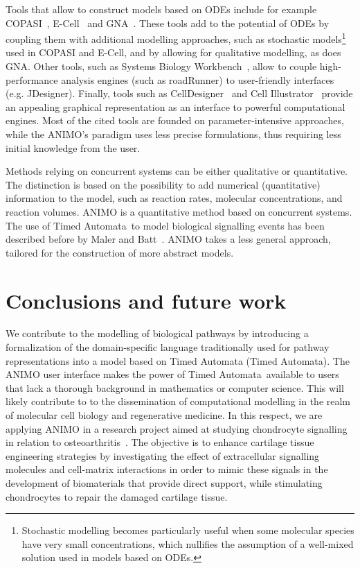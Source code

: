 \documentclass[journal, 10pt]{IEEEtran}
\def\tas{Timed Automata}
\begin{document}
Tools that allow to construct models based on ODEs include for example COPASI~\cite{copasi}, 
E-Cell~\cite{e-cell} and GNA~\cite{gna}.
These tools add to the potential of ODEs by coupling them with additional modelling approaches,
such as stochastic models\footnote{Stochastic modelling becomes particularly useful when some
molecular species have very small concentrations, which nullifies the assumption of a well-mixed solution used in models based on ODEs.}
used in COPASI and E-Cell, and by allowing for qualitative modelling, as does GNA.
Other tools, such as Systems Biology Workbench~\cite{sbw}, allow to couple high-performance
analysis engines (such as roadRunner) to user-friendly interfaces (e.g. JDesigner). Finally, tools such as CellDesigner~\cite{celldesigner}
and Cell Illustrator~\cite{cell-illustrator}
provide an appealing graphical representation as an interface to powerful computational engines.
Most of the cited tools are founded on parameter-intensive approaches, while the ANIMO's paradigm
uses less precise formulations, thus requiring less initial knowledge from the user.


Methods relying on concurrent systems
can be either qualitative or quantitative. The distinction is based on the possibility to add numerical 
(quantitative) information to the model, such as reaction rates, molecular concentrations, and reaction volumes. 
ANIMO is a quantitative method based on concurrent systems. 
The use of \tas\ to model biological signalling events has been described before by Maler and Batt~\cite{oded-ta-discretization}. 
ANIMO takes a less general approach, tailored for the construction of more abstract models.


\section{Conclusions and future work}\label{sec:conclusions}
We contribute to the modelling of biological pathways by introducing a formalization of the
domain-specific language traditionally used for pathway representations into a model based on Timed Automata (\tas).
The ANIMO user interface makes the power of \tas\ available 
to users that lack a thorough background in mathematics or computer science. This will likely contribute to to the 
dissemination of computational modelling in the realm of molecular cell biology and regenerative medicine.
In this respect, we are applying ANIMO in a research project aimed at studying
chondrocyte signalling in relation to osteoarthritis~\cite{oa-bio1,oa-bio2}. The objective is to enhance
cartilage tissue engineering strategies by investigating the effect of
extracellular signalling molecules and cell-matrix interactions in order to mimic
these signals in the development of biomaterials that provide direct
support, while stimulating chondrocytes to repair the damaged cartilage tissue.
\end{document}

